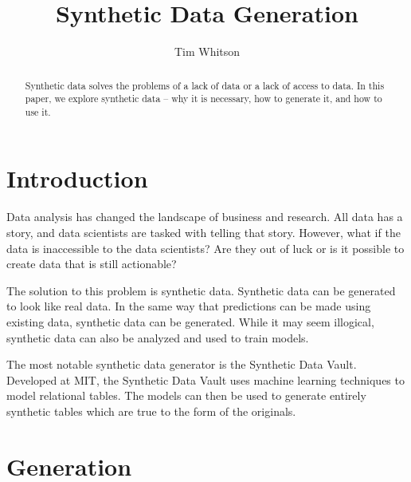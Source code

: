 
\title{Synthetic Data Generation}

\author{Tim Whitson}

\renewcommand{\shortauthors}{T. Whitson}

\begin{abstract}
Synthetic data solves the problems of a lack of data or a lack of access to data. In this paper, we explore synthetic data -- why it is necessary, how to generate it, and how to use it.
\end{abstract}


\maketitle

\section{Introduction}

Data analysis has changed the landscape of business and research. All data has a story, and data scientists are tasked with telling that story. However, what if the data is inaccessible to the data scientists? Are they out of luck or is it possible to create data that is still actionable?

The solution to this problem is synthetic data. Synthetic data can be generated to look like real data. In the same way that predictions can be made using existing data, synthetic data can be generated. While it may seem illogical, synthetic data can also be analyzed and used to train models.

The most notable synthetic data generator is the Synthetic Data Vault. Developed at MIT, the Synthetic Data Vault uses machine learning techniques to model relational tables. The models can then be used to generate entirely synthetic tables which are true to the form of the originals.\cite{}

\section{Generation}

